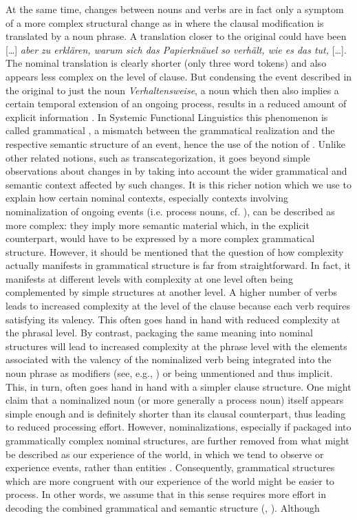 \documentclass[output=paper]{LSP/langsci}
\begin{document}
At the same time, changes between nouns and verbs are in fact only a symptom of a more complex structural change as in   where the clausal modification is translated by a noun phrase. A translation closer to the original could have been [\ldots] \textit{aber zu erklären, warum sich das Papierknäuel so verhält, wie es das tut,} [\ldots]. The nominal translation is clearly shorter (only three word tokens) and also appears less complex on the level of clause. But condensing the event described in the original to just the noun \textit{Verhaltensweise}, a noun which then also implies a certain temporal extension of an ongoing process, results in a reduced amount of explicit information \citep{Steiner2005, Halliday1999}. In Systemic Functional Linguistics this phenomenon is called grammatical , a mismatch between the grammatical realization and the respective semantic structure of an event, hence the use of the notion of  \citep[665]{Halliday2013}. Unlike other related notions, such as transcategorization, it goes beyond simple observations about changes in  by taking into account the wider grammatical and semantic context affected by such changes. It is this richer notion which we use to explain how certain nominal contexts, especially contexts involving nominalization of ongoing events (i.e. process nouns, cf. \citealt{Fontaine2017}), can be described as more complex: they imply more semantic material which, in the explicit counterpart, would have to be expressed by a more complex grammatical structure. However, it should be mentioned that the question of how complexity actually manifests in grammatical structure is far from straightforward. In fact, it manifests at different levels with complexity at one level often being complemented by simple structures at another level. A higher number of verbs leads to increased complexity at the level of the clause because each verb requires satisfying its valency. This often goes hand in hand with reduced complexity at the phrasal level. By contrast, packaging the same meaning into nominal structures will lead to increased complexity at the phrase level with the elements associated with the valency of the nominalized verb being integrated into the noun phrase as modifiers (see, e.g., \citealt{Halliday2001}) or being unmentioned and thus implicit. This, in turn, often goes hand in hand with a simpler clause structure. One might claim that a nominalized noun (or more generally a process noun) itself appears simple enough and is definitely shorter than its clausal counterpart, thus leading to reduced processing effort. However, nominalizations, especially if packaged into grammatically complex nominal structures, are further removed from what might be described as our experience of the world, in which we tend to observe or experience events, rather than entities \citep{Halliday2013}. Consequently, grammatical structures which are more congruent with our experience of the world might be easier to process. In other words, we assume that  in this sense requires more effort in decoding the combined grammatical and semantic structure (\citealt[15]{Steiner2001Translations}, \citealt[258]{HansenSchirra2012Towards}). Although \citet[260]{HansenSchirra2012Towards} 
\end{document}
